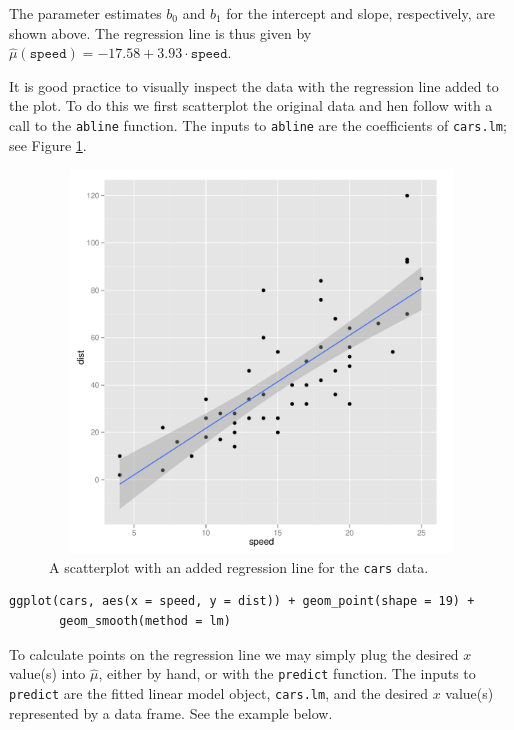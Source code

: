 \documentclass[captions=tableheading]{scrbook}
\begin{document}
The parameter estimates \( b_{0} \) and \( b_{1} \) for the intercept and slope, respectively, are shown above. The regression line is thus given by \( \hat{\mu}(\mathtt{speed}) =  -17.58 +  3.93 \cdot \mathtt{speed} \).

It is good practice to visually inspect the data with the regression line added to the plot. To do this we first scatterplot the original data and hen follow with a call to the \texttt{abline} function. The inputs to \texttt{abline} are the coefficients of \texttt{cars.lm}; see Figure \ref{fig:Scatter-cars-regline}.

\begin{figure}[ht!]
  \includegraphics[width=5in, height=4in]{img/carline.pdf}
  \caption[Scatterplot with added regression line for the \texttt{cars} data]{\small A scatterplot with an added regression line for the \texttt{cars} data.}
  \label{fig:Scatter-cars-regline}
\end{figure}


\begin{verbatim}
ggplot(cars, aes(x = speed, y = dist)) + geom_point(shape = 19) + 
       geom_smooth(method = lm)
\end{verbatim}

To calculate points on the regression line we may simply plug the desired \(x\) value(s) into \( \hat{\mu} \), either by hand, or with the \texttt{predict} function. The inputs to \texttt{predict} are the fitted linear model object, \texttt{cars.lm}, and the desired \(x\) value(s) represented by a data frame. See the example below.
\end{document}
